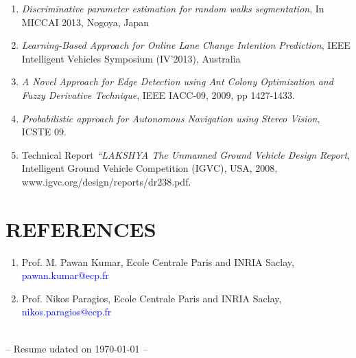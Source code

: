 \documentclass{res}
\begin{document}
\begin{resume}
\begin{enumerate}
        \item \emph{Discriminative parameter estimation for random walks segmentation}, { In MICCAI 2013, Nogoya, Japan}
        \item \emph{Learning-Based Approach for Online Lane Change Intention Prediction}, { IEEE Intelligent Vehicles Symposium (IV'2013), Australia}
        \item \emph{A Novel Approach for Edge Detection using Ant Colony Optimization and Fuzzy Derivative Technique}, { IEEE IACC-09}, 2009, pp 1427-1433.           
        \item \emph{Probabilistic approach for Autonomous Navigation using Stereo Vision}, ICSTE 09.
        \item Technical Report \emph{“LAKSHYA The Unmanned Ground Vehicle Design Report}, Intelligent Ground Vehicle Competition (IGVC), USA, 2008, www.igvc.org/design/reports/dr238.pdf.

        \end{enumerate}

        \section{REFERENCES}    
        \begin{enumerate}
        \item Prof. M. Pawan Kumar, Ecole Centrale Paris and INRIA Saclay, \textcolor{blue}{pawan.kumar@ecp.fr}
        \item Prof. Nikos Paragios, Ecole Centrale Paris and INRIA Saclay, \textcolor{blue}{nikos.paragios@ecp.fr}
        \end{enumerate}
        \\ {\tiny -- Resume udated on {\today} --}


        \end{resume}
        
\end{document}
